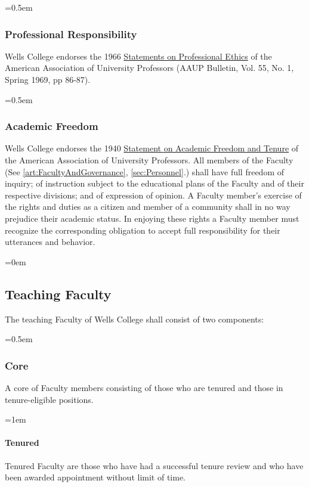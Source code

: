 \documentclass{manual}
\let\oldsubsection\subsection
\renewcommand\subsection{\leftskip=0em\oldsubsection}
\let\oldsubsubsection\subsubsection
\renewcommand\subsubsection{\leftskip=0.5em\oldsubsubsection}
\let\oldparagraph\paragraph
\renewcommand\paragraph{\leftskip=1em\oldparagraph}
\begin{document}
\subsubsection{Professional Responsibility}
Wells College endorses the 1966 \href{http://www.aaup.org/AAUP/pubsres/policydocs/contents/statementonprofessionalethics.htm}{Statements on Professional Ethics} of the American Association of University Professors (AAUP Bulletin, Vol. 55, No. 1, Spring 1969, pp 86-87).

\subsubsection{Academic Freedom} \label{sub:AcademicFreedom}
Wells College endorses the 1940 \href{http://www.aaup.org/AAUP/pubsres/policydocs/contents/1940statement.htm}{Statement on Academic Freedom and Tenure} of the American Association of University Professors. All members of the Faculty (See \cref{art:FacultyAndGovernance}, \cref{sec:Personnel}.) shall have full freedom of inquiry; of instruction subject to the educational plans of the Faculty and of their respective divisions; and of expression of opinion. A Faculty member's exercise of the rights and duties as a citizen and member of a community shall in no way prejudice their academic status. In enjoying these rights a Faculty member must recognize the corresponding obligation to accept full responsibility for their utterances and behavior.

\subsection{Teaching Faculty}\label{sec:TeachingFaculty}
The teaching Faculty of Wells College shall consist of two components:

\subsubsection{Core}\label{sub:Core}
A core of Faculty members consisting of those who are tenured and those in tenure-eligible positions.

\paragraph{Tenured} 
Tenured Faculty are those who have had a successful tenure review and who have been awarded appointment without limit of time.
\end{document}
